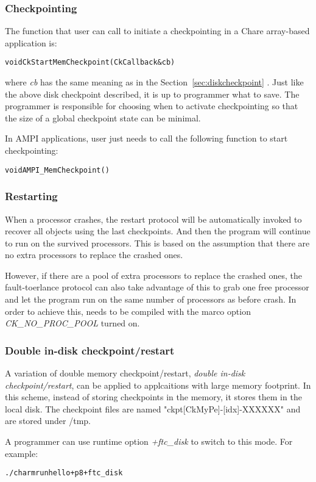 \subsubsection{Checkpointing}

The function that user can call to initiate a checkpointing in a Chare 
array-based application is: 

\begin{alltt}
      void CkStartMemCheckpoint(CkCallback &cb)
\end{alltt}

where {\it cb} has the same meaning as in the Section~\ref{sec:diskcheckpoint} .
Just like the above disk checkpoint described, it is up to programmer what to save.
The programmer is responsible for choosing when to activate checkpointing so that
the size of a global checkpoint state can be minimal.

In AMPI applications, user just needs to call the following function to 
start checkpointing:

\begin{alltt}
      void AMPI_MemCheckpoint()
\end{alltt}

\subsubsection{Restarting}

When a processor crashes, the restart protocol will be automatically
invoked to recover all objects using the last checkpoints. And then the program
will continue to run on the survived processors. This is based on the assumption
that there are no extra processors to replace the crashed ones. 

However, if there are a pool of extra processors to replace the crashed ones, 
the fault-toerlance protocol can also take advantage of this to grab one
free processor and let the program run on the same number of processors 
as before crash. 
In order to achieve this, \charmpp{} needs to be compiled with the marco option
 {\it CK\_NO\_PROC\_POOL} turned on.


\subsubsection{Double in-disk checkpoint/restart}

A variation of double memory checkpoint/restart,
{\it double in-disk checkpoint/restart},
can be applied to applcaitions with large memory footprint.
In this scheme, instead of storing checkpoints in the memory, it stores 
them in the local disk.
The checkpoint files are named "ckpt[CkMyPe]-[idx]-XXXXXX" and are stored under /tmp.

A programmer can use runtime option {\it +ftc\_disk} to switch to this mode.
For example:

\begin{alltt}
   ./charmrun hello +p8 +ftc_disk
\end{alltt} 



